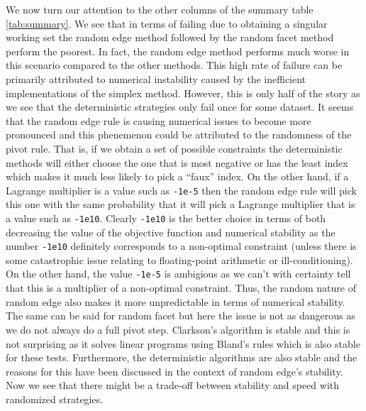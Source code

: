 \documentclass{standalone}
\begin{document}
  We now turn our attention to the other columns of the summary table \ref{tab:summary}. We see that in terms of failing due to obtaining a singular working set the random edge method followed by the random facet method perform the poorest. In fact, the random edge method performs much worse in this scenario compared to the other methods. This high rate of failure can be primarily attributed to numerical instability caused by the inefficient implementations of the simplex method. However, this is only half of the story as we see that the deterministic strategies only fail once for some dataset. It seems that the random edge rule is causing numerical issues to become more pronounced and this phenemenon could be attributed to the randomness of the pivot rule. That is, if we obtain a set of possible constraints the deterministic methods will either choose the one that is most negative or has the least index which makes it much less likely to pick a ``faux'' index. On the other hand, if a Lagrange multiplier is a value such as \verb|-1e-5| then the random edge rule will pick this one with the same probability that it will pick a Lagrange multiplier that is a value such as \verb|-1e10|. Clearly \verb|-1e10| is the better choice in terms of both decreasing the value of the objective function and numerical stability as the number \verb|-1e10| definitely corresponds to a non-optimal constraint (unless there is some catastrophic issue relating to floating-point arithmetic or ill-conditioning). On the other hand, the value \verb|-1e-5| is ambigious as we can't with certainty tell that this is a multiplier of a non-optimal constraint. Thus, the random nature of random edge also makes it more unpredictable in terms of numerical stability. The same can be said for random facet but here the issue is not as dangerous as we do not always do a full pivot step. Clarkson's algorithm is stable and this is not surprising as it solves linear programs using Bland's rules which is also stable for these tests. Furthermore, the deterministic algorithms are also stable and the reasons for this have been discussed in the context of random edge's stability. Now we see that there might be a trade-off between stability and speed with randomized strategies.\par
\end{document}

